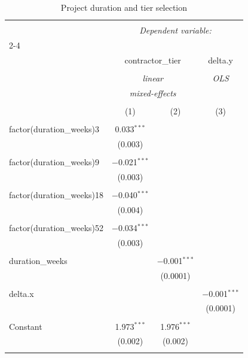 
\begin{table}[!htbp] \centering 
  \caption{Project duration and tier selection} 
  \label{tab:duration} 
\begin{tabular}{@{\extracolsep{5pt}}lccc} 
\\[-1.8ex]\hline 
\hline \\[-1.8ex] 
 & \multicolumn{3}{c}{\textit{Dependent variable:}} \\ 
\cline{2-4} 
\\[-1.8ex] & \multicolumn{2}{c}{contractor\_tier} & delta.y \\ 
\\[-1.8ex] & \multicolumn{2}{c}{\textit{linear}} & \textit{OLS} \\ 
 & \multicolumn{2}{c}{\textit{mixed-effects}} & \textit{} \\ 
\\[-1.8ex] & (1) & (2) & (3)\\ 
\hline \\[-1.8ex] 
 factor(duration\_weeks)3 & 0.033$^{***}$ &  &  \\ 
  & (0.003) &  &  \\ 
  & & & \\ 
 factor(duration\_weeks)9 & $-$0.021$^{***}$ &  &  \\ 
  & (0.003) &  &  \\ 
  & & & \\ 
 factor(duration\_weeks)18 & $-$0.040$^{***}$ &  &  \\ 
  & (0.004) &  &  \\ 
  & & & \\ 
 factor(duration\_weeks)52 & $-$0.034$^{***}$ &  &  \\ 
  & (0.003) &  &  \\ 
  & & & \\ 
 duration\_weeks &  & $-$0.001$^{***}$ &  \\ 
  &  & (0.0001) &  \\ 
  & & & \\ 
 delta.x &  &  & $-$0.001$^{***}$ \\ 
  &  &  & (0.0001) \\ 
  & & & \\ 
 Constant & 1.973$^{***}$ & 1.976$^{***}$ &  \\ 
  & (0.002) & (0.002) &  \\ 
  & & & \\ 

\end{tabular}
\end{table}
